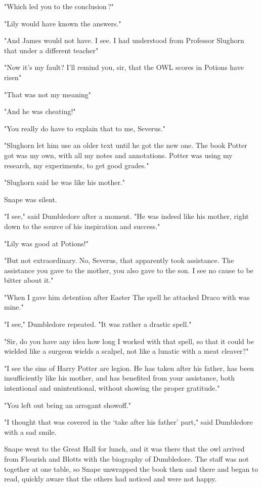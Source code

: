 "Which led you to the conclusion{\el}\,?"

"Lily would have known the answers."

"And James would not have. I see. I had understood from Professor Slughorn that under a different teacher{\el}"

"Now it's my fault? I'll remind you, sir, that the OWL scores in Potions have risen{\el}"

"That was not my meaning{\el}"

"And he was cheating!"

"You really do have to explain that to me, Severus."

"Slughorn let him use an older text until he got the new one. The book Potter got was my own, with all my notes and annotations. Potter was using my research, my experiments, to get good grades."

"Slughorn said he was like his mother."

Snape was silent.

"I see," said Dumbledore after a moment. "He was indeed like his mother, right down to the source of his inspiration and success."

"Lily was good at Potions!"

"But not extraordinary. No, Severus, that apparently took assistance. The assistance you gave to the mother, you also gave to the son. I see no cause to be bitter about it."

"When I gave him detention after Easter{\el} The spell he attacked Draco with was mine."

"I see," Dumbledore repeated. "It was rather a{\el} drastic spell."

"Sir, do you have any idea how long I worked with that spell, so that it could be wielded like a surgeon wields a scalpel, not like a lunatic with a meat cleaver?"

"I see the sins of Harry Potter are legion. He has taken after his father, has been insufficiently like his mother, and has benefited from your assistance, both intentional and unintentional, without showing the proper gratitude."

"You left out being an arrogant showoff."

"I thought that was covered in the `take after his father' part," said Dumbledore with a sad smile.

Snape went to the Great Hall for lunch, and it was there that the owl arrived from Flourish and Blotts with the biography of Dumbledore. The staff was not together at one table, so Snape unwrapped the book then and there and began to read, quickly aware that the others had noticed and were{\el} not happy.

